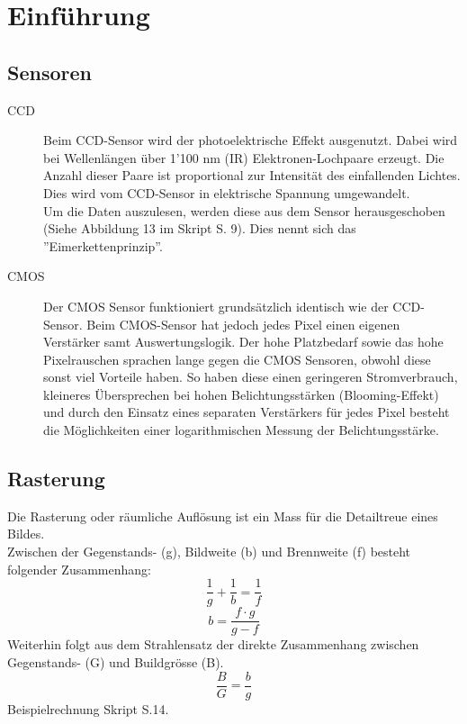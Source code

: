 \section{Einführung}
\subsection{Sensoren}
\begin{description}
    \item[CCD] Beim CCD-Sensor wird der photoelektrische Effekt ausgenutzt. Dabei wird bei Wellenlängen über 1'100 nm (IR) Elektronen-Lochpaare erzeugt. Die Anzahl dieser Paare ist proportional zur Intensität des einfallenden Lichtes. Dies wird vom CCD-Sensor in elektrische Spannung umgewandelt.\\
    Um die Daten auszulesen, werden diese aus dem Sensor herausgeschoben (Siehe Abbildung 13 im Skript S. 9). Dies nennt sich das ''Eimerkettenprinzip''.
    \item[CMOS] Der CMOS Sensor funktioniert grundsätzlich identisch wie der CCD-Sensor. Beim CMOS-Sensor hat jedoch jedes Pixel einen eigenen Verstärker samt Auswertungslogik. Der hohe Platzbedarf sowie das hohe Pixelrauschen sprachen lange gegen die CMOS Sensoren, obwohl diese sonst viel Vorteile haben. So haben diese einen geringeren Stromverbrauch, kleineres Übersprechen bei hohen Belichtungsstärken (Blooming-Effekt) und durch den Einsatz eines separaten Verstärkers für jedes Pixel besteht die Möglichkeiten einer logarithmischen Messung der Belichtungsstärke.
\end{description}
\subsection{Rasterung}
Die Rasterung oder räumliche Auflösung ist ein Mass für die Detailtreue eines Bildes.\\
Zwischen der Gegenstands- (g), Bildweite (b) und Brennweite (f) besteht folgender Zusammenhang:
\begin{equation}
\frac{1}{g} + \frac{1}{b} = \frac{1}{f}
\end{equation}
\begin{equation}
b=\frac{f\cdot g}{g - f}
\end{equation}
Weiterhin folgt aus dem Strahlensatz der direkte Zusammenhang zwischen Gegenstands- (G) und Buildgrösse (B).
\begin{equation}
\frac{B}{G}=\frac{b}{g}
\end{equation}
Beispielrechnung Skript S.14.
